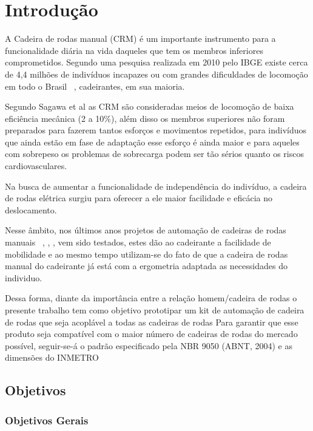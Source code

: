 \chapter[Introdução]{Introdução}

A Cadeira de rodas manual (CRM) é um importante instrumento para a funcionalidade diária na vida daqueles que tem os membros inferiores comprometidos. Segundo uma pesquisa realizada em 2010 pelo IBGE existe cerca de 4,4 milhões de indivíduos incapazes ou com grandes dificuldades de locomoção em todo o Brasil ~\cite{ibge:cartilha:2010}, cadeirantes, em sua maioria.

Segundo Sagawa et al  as CRM são consideradas meios de locomoção de baixa eficiência mecânica (2 a 10\%), além disso os membros superiores não foram preparados para fazerem tantos esforços e movimentos repetidos,  para indivíduos que ainda estão em fase de adaptação esse esforço é ainda maior e para aqueles com sobrepeso os problemas de sobrecarga podem ser tão sérios quanto os riscos cardiovasculares.

Na busca de aumentar a funcionalidade de independência do indivíduo, a cadeira de rodas elétrica surgiu para oferecer a ele maior facilidade e eficácia no deslocamento. 

Nesse âmbito, nos últimos anos projetos de automação de cadeiras de rodas manuais ~\cite{brunel:wheelchair:2004}, \cite{artigo_rudi}, \cite{patent_cadeira_rodas_eletrica},	 \cite{marcos:controle:2002}  vem sido testados, estes dão ao cadeirante a facilidade de mobilidade  e ao mesmo tempo utilizam-se do fato de que a cadeira de rodas manual do cadeirante já está com a ergometria  adaptada as necessidades do individuo.

Dessa forma, diante da importância entre a relação homem/cadeira de rodas o presente trabalho tem como objetivo prototipar um kit de automação de cadeira de rodas que seja acoplável a todas as cadeiras de rodas  Para garantir que esse produto seja compatível com o maior número de cadeiras de rodas do mercado possível, seguir-se-á o padrão especificado pela NBR 9050 (ABNT, 2004) e as dimensões do INMETRO~\cite{inmetro}

\section{Objetivos}
\subsection{Objetivos Gerais}

